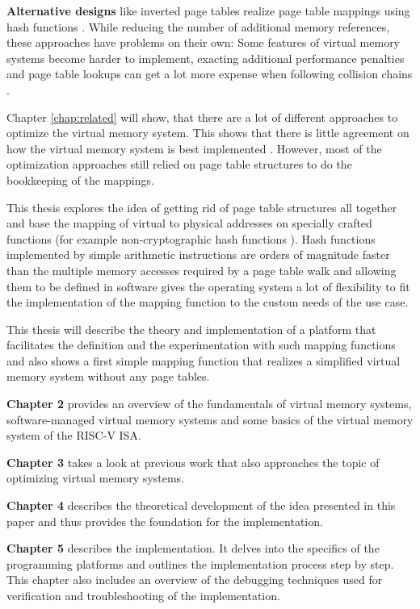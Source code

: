 \textbf{Alternative designs} like inverted page tables realize page table mappings using hash functions \cite{tanenbaumOS}. While reducing the number of additional memory references, these approaches have problems on their own: Some features of virtual memory systems become harder to implement, exacting additional performance penalties \cite{yaniv2016hash} and page table lookups can get a lot more expense when following collision chains \cite{jacob1998look}.

Chapter \ref{chap:related} will show, that there are a lot of different approaches to optimize the virtual memory system.
This shows that there is little agreement on how the virtual memory system is best implemented \cite{jacob1998look}.
However, most of the optimization approaches still relied on page table structures to do the bookkeeping of the mappings.

This thesis explores the idea of getting rid of page table structures all together and base the mapping of virtual to physical addresses on specially crafted functions (for example non-cryptographic hash functions \cite{mittelbach2021non}).
Hash functions implemented by simple arithmetic instructions are orders of magnitude faster than the multiple memory accesses required by a page table walk \cite{tanenbaumOS} and allowing them to be defined in software gives the operating system a lot of flexibility to fit the implementation of the mapping function to the custom needs of the use case.

This thesis will describe the theory and implementation of a platform that facilitates the definition and the experimentation with such mapping functions and also shows a first simple mapping function that realizes a simplified virtual memory system without any page tables.


\textbf{Chapter 2} provides an overview of the fundamentals of virtual memory systems, software-managed virtual memory systems and some basics of the virtual memory system of the RISC-V ISA.

\textbf{Chapter 3} takes a look at previous work that also approaches the topic of optimizing virtual memory systems.

\textbf{Chapter 4} describes the theoretical development of the idea presented in this paper and thus provides the foundation for the implementation.

\textbf{Chapter 5} describes the implementation. It delves into the specifics of the programming platforms and outlines the implementation process step by step. This chapter also includes an overview of the debugging techniques used for verification and troubleshooting of the implementation.

